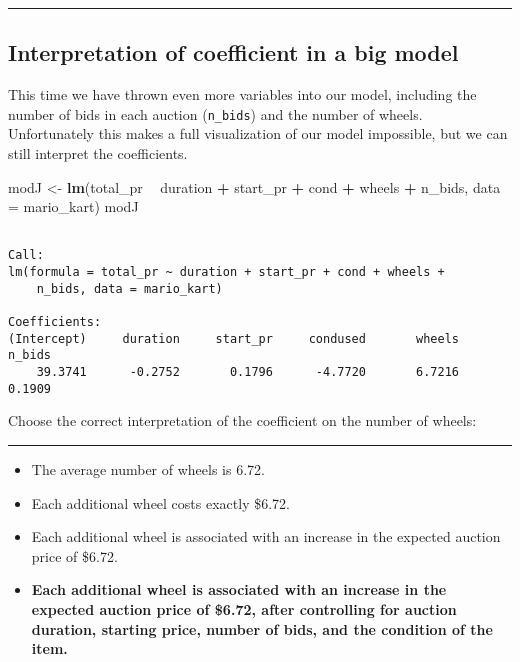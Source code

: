 \documentclass[
]{book}
\newenvironment{Shaded}{\begin{snugshade}}{\end{snugshade}}
\newcommand{\DataTypeTok}[1]{\textcolor[rgb]{0.13,0.29,0.53}{#1}}
\newcommand{\KeywordTok}[1]{\textcolor[rgb]{0.13,0.29,0.53}{\textbf{#1}}}
\newcommand{\NormalTok}[1]{#1}
\newcommand{\OperatorTok}[1]{\textcolor[rgb]{0.81,0.36,0.00}{\textbf{#1}}}
\newcommand{\StringTok}[1]{\textcolor[rgb]{0.31,0.60,0.02}{#1}}
\begin{document}
\begin{center}\rule{0.5\linewidth}{0.5pt}\end{center}

\hypertarget{interpretation-of-coefficient-in-a-big-model}{%
\subsection*{Interpretation of coefficient in a big model}\label{interpretation-of-coefficient-in-a-big-model}}

This time we have thrown even more variables into our model, including the number of bids in each auction (\texttt{n\_bids}) and the number of wheels. Unfortunately this makes a full visualization of our model impossible, but we can still interpret the coefficients.

\begin{Shaded}
\begin{Highlighting}[]
\NormalTok{modJ <-}\StringTok{ }\KeywordTok{lm}\NormalTok{(total_pr }\OperatorTok{~}\StringTok{ }\NormalTok{duration }\OperatorTok{+}\StringTok{ }\NormalTok{start_pr }\OperatorTok{+}\StringTok{ }\NormalTok{cond }\OperatorTok{+}\StringTok{ }\NormalTok{wheels }\OperatorTok{+}\StringTok{ }\NormalTok{n_bids, }
    \DataTypeTok{data =}\NormalTok{ mario_kart)}
\NormalTok{modJ}
\end{Highlighting}
\end{Shaded}

\begin{verbatim}

Call:
lm(formula = total_pr ~ duration + start_pr + cond + wheels + 
    n_bids, data = mario_kart)

Coefficients:
(Intercept)     duration     start_pr     condused       wheels       n_bids  
    39.3741      -0.2752       0.1796      -4.7720       6.7216       0.1909  
\end{verbatim}

Choose the correct interpretation of the coefficient on the number of wheels:

\begin{center}\rule{0.5\linewidth}{0.5pt}\end{center}

\begin{itemize}
\item
  The average number of wheels is 6.72.
\item
  Each additional wheel costs exactly \$6.72.
\item
  Each additional wheel is associated with an increase in the expected auction price of \$6.72.
\item
  \textbf{Each additional wheel is associated with an increase in the expected auction price of \$6.72, after controlling for auction duration, starting price, number of bids, and the condition of the item.}
\end{itemize}
\end{document}
